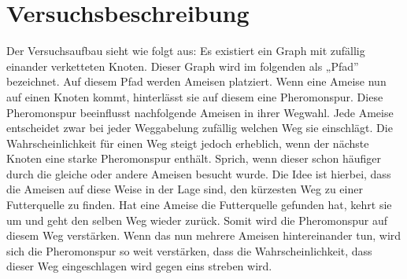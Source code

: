 
\section{Versuchsbeschreibung}

Der Versuchsaufbau sieht wie folgt aus: Es existiert ein Graph mit
zufällig einander verketteten Knoten. Dieser Graph wird im
folgenden als „Pfad” bezeichnet. Auf diesem Pfad werden Ameisen
platziert. Wenn eine Ameise nun auf einen Knoten kommt, hinterlässt
sie auf diesem eine Pheromonspur. Diese Pheromonspur beeinflusst
nachfolgende Ameisen in ihrer Wegwahl. Jede Ameise entscheidet zwar
bei jeder Weggabelung zufällig welchen Weg sie einschlägt. Die
Wahrscheinlichkeit für einen Weg steigt jedoch erheblich, wenn der
nächste Knoten eine starke Pheromonspur enthält. Sprich, wenn dieser
schon häufiger durch die gleiche oder andere Ameisen besucht wurde.
Die Idee ist hierbei, dass die Ameisen auf diese Weise in der Lage
sind, den kürzesten Weg zu einer Futterquelle zu finden.
Hat eine Ameise die Futterquelle gefunden hat, kehrt sie um und
geht den selben Weg wieder zurück. Somit wird die Pheromonspur auf
diesem Weg verstärken. Wenn das nun mehrere Ameisen hintereinander
tun, wird sich die Pheromonspur so weit verstärken, dass die
Wahrscheinlichkeit, dass dieser Weg eingeschlagen wird gegen eins
streben wird.
